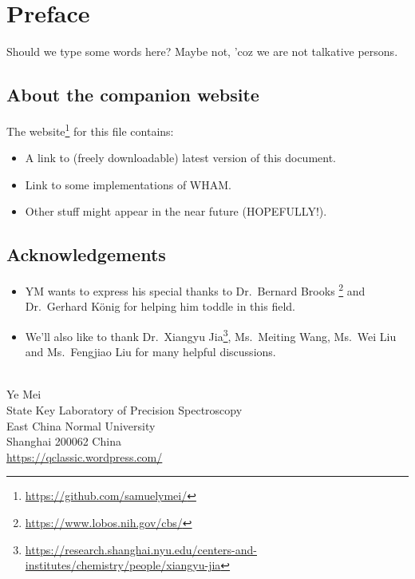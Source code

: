 \chapter*{Preface}
Should we type some words here? Maybe not, 'coz we are not talkative persons.

\section*{About the companion website}
The website\footnote{\url{https://github.com/samuelymei/}} for this file contains:
\begin{itemize}
  \item A link to (freely downloadable) latest version of this document.
  \item Link to some implementations of WHAM.
  \item Other stuff might appear in the near future (HOPEFULLY!).
\end{itemize}

\section*{Acknowledgements}
\begin{itemize}
\item YM wants to express his special thanks to Dr.~Bernard Brooks \footnote{\url{https://www.lobos.nih.gov/cbs/}} and Dr.~Gerhard K\"onig for helping him toddle in this field.
\item We'll also like to thank Dr.~Xiangyu Jia\footnote{\url{https://research.shanghai.nyu.edu/centers-and-institutes/chemistry/people/xiangyu-jia}}, Ms.~Meiting Wang, Ms.~Wei Liu and Ms.~Fengjiao Liu for many helpful discussions.
\end{itemize}
\mbox{}\\
\noindent Ye Mei \\
\noindent State Key Laboratory of Precision Spectroscopy\\
\noindent East China Normal University\\
\noindent Shanghai 200062 China\\
\noindent \url{https://qclassic.wordpress.com/}